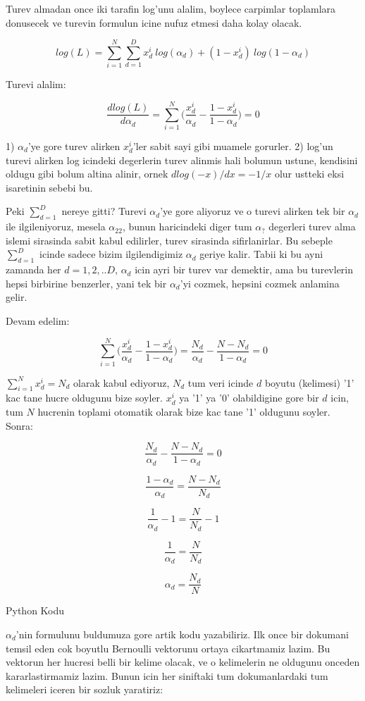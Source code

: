 \documentclass[12pt,fleqn]{article}\usepackage{../common}
\begin{document}
Turev almadan once iki tarafin log'unu alalim, boylece carpimlar toplamlara
donusecek ve turevin formulun icine nufuz etmesi daha kolay olacak.

\[ log(L) = \sum_{i=1}^N \sum_{d=1}^{D} {x_d^i}\ log (\alpha_d) + 
(1-x_d^i)\ log (1-\alpha_d) \]

Turevi alalim:

\[ \frac{dlog(L)}{d\alpha_d} = \sum_{i=1}^N \bigg( \frac{x_d^i}{\alpha_d} -
\frac{1-x_d^i}{1-\alpha_d} \bigg) = 0
 \]

1) $\alpha_d$'ye gore turev alirken $x_d^i$'ler sabit sayi gibi muamele
gorurler. 2) log'un turevi alirken log icindeki degerlerin turev alinmis hali
bolumun ustune, kendisini oldugu gibi bolum altina alinir, ornek 
$dlog(-x)/dx = -1/x$ olur ustteki eksi isaretinin sebebi bu. 

Peki $\sum_{d=1}^{D}$ nereye gitti? Turevi $\alpha_d$'ye gore aliyoruz ve o
turevi alirken tek bir $\alpha_d$ ile ilgileniyoruz, mesela $\alpha_{22}$,
bunun haricindeki diger tum $\alpha_?$ degerleri turev alma islemi
sirasinda sabit kabul edilirler, turev sirasinda sifirlanirlar. Bu sebeple
$\sum_{d=1}^{D}$ icinde sadece bizim ilgilendigimiz $\alpha_d$ geriye
kalir. Tabii ki bu ayni zamanda her $d=1,2,..D$, $\alpha_d$ icin ayri bir
turev var demektir, ama bu turevlerin hepsi birbirine benzerler, yani tek
bir $\alpha_d$'yi cozmek, hepsini cozmek anlamina gelir.

Devam edelim:

\[ \sum_{i=1}^N \bigg( \frac{x_d^i}{\alpha_d} - \frac{1-x_d^i}{1-\alpha_d} \bigg) =
\frac{N_d}{\alpha_d} - \frac{N-N_d}{1-\alpha_d} = 0
 \]

$\sum_{i=1}^N x_d^i = N_d$ olarak kabul ediyoruz, $N_d$ tum veri icinde $d$
boyutu (kelimesi) '1' kac tane hucre oldugunu bize soyler. $x_d^i$ ya '1' ya '0'
olabildigine gore bir $d$ icin, tum $N$ hucrenin toplami otomatik olarak bize
kac tane '1' oldugunu soyler. Sonra:

\[ \frac{N_d}{\alpha_d} - \frac{N-N_d}{1-\alpha_d} = 0  \]

\[ \frac{1-\alpha_d}{\alpha_d} = \frac{N-N_d}{N_d}   \]

\[ \frac{1}{\alpha_d} - 1 = \frac{N}{N_d} - 1  \]

\[ \frac{1}{\alpha_d} = \frac{N}{N_d}  \]

\[ \alpha_d = \frac{N_d}{N}  \]

Python Kodu

$\alpha_d$'nin formulunu buldumuza gore artik kodu yazabiliriz. Ilk once bir
dokumani temsil eden cok boyutlu Bernoulli vektorunu ortaya cikartmamiz
lazim. Bu vektorun her hucresi belli bir kelime olacak, ve o kelimelerin ne
oldugunu onceden kararlastirmamiz lazim. Bunun icin her siniftaki tum
dokumanlardaki tum kelimeleri iceren bir sozluk yaratiriz:
\end{document}
